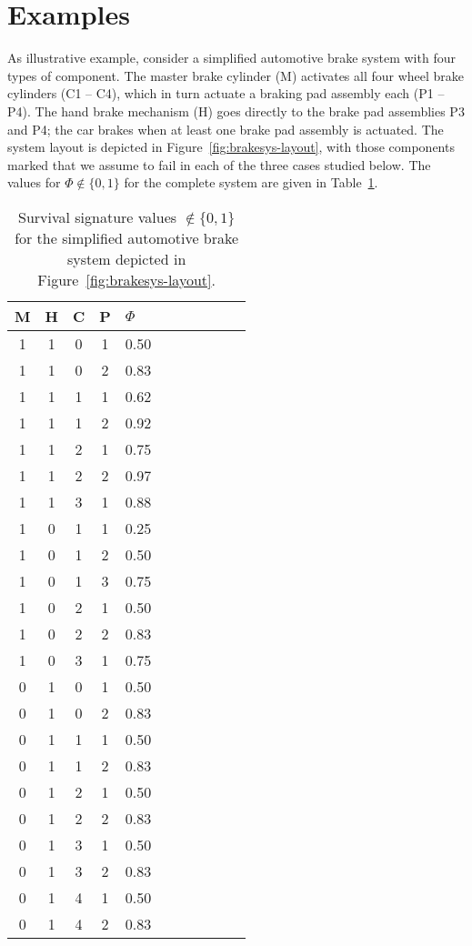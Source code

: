 \documentclass[Journal,letterpaper]{ascelike-new}
\begin{document}
\section{Examples}
\label{sec:examples}

As illustrative example, consider a simplified automotive brake system with four types of component.
The master brake cylinder (M) activates all four wheel brake cylinders (C1 -- C4),
which in turn actuate a braking pad assembly each (P1 -- P4).
The hand brake mechanism (H) goes directly to the brake pad assemblies P3 and P4;
the car brakes when at least one brake pad assembly is actuated.
The system layout is depicted in Figure~\ref{fig:brakesys-layout},
with those components marked that we assume to fail in each of the three cases studied below.
The values for $\Phi \not\in \{0,1\}$ for the complete system are given in Table~\ref{tab:brake-survsign}.

\begin{table}
\caption{Survival signature values $\not\in \{0,1\}$ for the simplified automotive brake system depicted in Figure~\ref{fig:brakesys-layout}.}
\label{tab:brake-survsign}
\centering
\begin{tabular}{cccclcccccl}
  \toprule
M & H & C & P & $\Phi$ \\ 
  \midrule
1 & 1 & 0 & 1 & 0.50 \\
1 & 1 & 0 & 2 & 0.83 \\
1 & 1 & 1 & 1 & 0.62 \\
1 & 1 & 1 & 2 & 0.92 \\
1 & 1 & 2 & 1 & 0.75 \\
1 & 1 & 2 & 2 & 0.97 \\
1 & 1 & 3 & 1 & 0.88 \\
1 & 0 & 1 & 1 & 0.25 \\ 
1 & 0 & 1 & 2 & 0.50 \\ 
1 & 0 & 1 & 3 & 0.75 \\ 
1 & 0 & 2 & 1 & 0.50 \\
1 & 0 & 2 & 2 & 0.83 \\
1 & 0 & 3 & 1 & 0.75 \\
0 & 1 & 0 & 1 & 0.50 \\
0 & 1 & 0 & 2 & 0.83 \\
0 & 1 & 1 & 1 & 0.50 \\
0 & 1 & 1 & 2 & 0.83 \\
0 & 1 & 2 & 1 & 0.50 \\
0 & 1 & 2 & 2 & 0.83 \\
0 & 1 & 3 & 1 & 0.50 \\
0 & 1 & 3 & 2 & 0.83 \\
0 & 1 & 4 & 1 & 0.50 \\
0 & 1 & 4 & 2 & 0.83 \\
   \bottomrule
\end{tabular}
\end{table}
\end{document}
